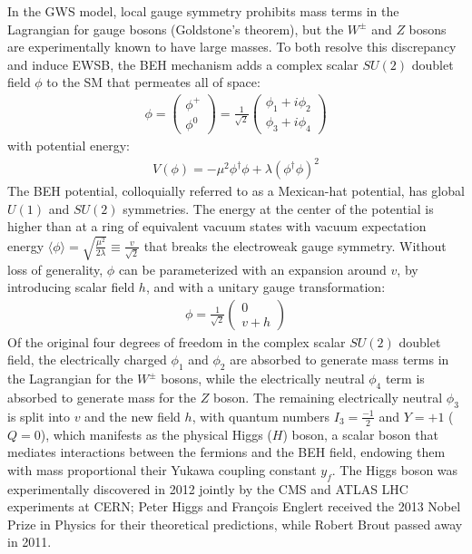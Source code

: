 In the GWS model, local gauge symmetry prohibits mass terms in the Lagrangian for gauge bosons (Goldstone's theorem), but the $W^\pm$ and $Z$ bosons are experimentally known to have large masses.
To both resolve this discrepancy and induce EWSB, the BEH mechanism adds a complex scalar $SU(2)$ doublet field $\phi$ to the SM that permeates all of space:
\begin{eqnarray}
\phi=\left(\begin{array}{l}
\phi^{+} \\
\phi^0
\end{array}\right)=\frac{1}{\sqrt{2}}\left(\begin{array}{l}
\phi_1+i \phi_2 \\
\phi_3+i \phi_4
\end{array}\right)
\end{eqnarray}
with potential energy:
\begin{eqnarray}
V(\phi) = -\mu^2 \phi^{\dagger} \phi + \lambda\left(\phi^{\dagger} \phi\right)^2
\end{eqnarray}
The BEH potential, colloquially referred to as a Mexican-hat potential, has global $U(1)$ and $SU(2)$ symmetries.
The energy at the center of the potential is higher than at a ring of equivalent vacuum states with vacuum expectation energy $\langle\phi\rangle=\sqrt{\frac{\mu^2}{2 \lambda}} \equiv \frac{v}{\sqrt{2}}$ that breaks the electroweak gauge symmetry.
Without loss of generality, $\phi$ can be parameterized with an expansion around $v$, by introducing scalar field $h$, and with a unitary gauge transformation:
\begin{eqnarray}
\phi=\frac{1}{\sqrt{2}}\left(\begin{array}{c}
0 \\
v+h
\end{array}\right)
\end{eqnarray}
Of the original four degrees of freedom in the complex scalar $SU(2)$ doublet field, the electrically charged $\phi_1$ and $\phi_2$ are absorbed to generate mass terms in the Lagrangian for the $W^\pm$ bosons, while the electrically neutral $\phi_4$ term is absorbed to generate mass for the $Z$ boson.
The remaining electrically neutral $\phi_3$ is split into $v$ and the new field $h$, with quantum numbers $I_3 = \frac{-1}{2}$ and $Y = +1$ ($Q = 0$), which manifests as the physical Higgs ($H$) boson, a scalar boson that mediates interactions between the fermions and the BEH field, endowing them with mass proportional their Yukawa coupling constant $y_f$.
The Higgs boson was experimentally discovered in 2012 jointly by the CMS and ATLAS LHC experiments at CERN; Peter Higgs and François Englert received the 2013 Nobel Prize in Physics for their theoretical predictions, while Robert Brout passed away in 2011.

